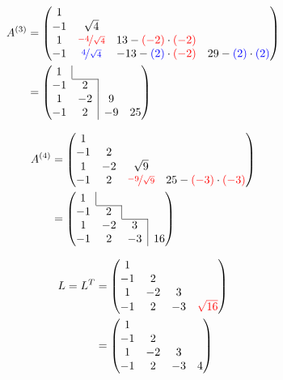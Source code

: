 \begin{align*}
A^{(3)} & =
\begin{pmatrix}1\\
  -1 & \sqrt{4}\\
  1  & {\color{red}\nicefrac{-4}{\sqrt{4}}} & 13-{\color{red}(-2)}\cdot{\color{red}(-2)}\\
  -1 & {\color{blue}\nicefrac{4}{\sqrt{4}}} & -13-{\color{blue}(2)}\cdot{\color{red}(-2)} & 29-{\color{blue}(2)}\cdot{\color{blue}(2)}
\end{pmatrix}\\
 & =
\begin{pmatrix}
  \bord{1}\\
  \cline{2-2}-1 & \bord{2}\\
  1             & \bord{-2} & 9\\
  -1            & \bord{2}  & -9 & 25
\end{pmatrix}
\end{align*}


\begin{align*}
A^{(4)} & =
\begin{pmatrix}
  1\\
  -1 & 2\\
  1  & -2 & \sqrt{9}\\
  -1 & 2  & {\color{red}\nicefrac{-9}{\sqrt{9}}} & 25-{\color{red}(-3)}\cdot{\color{red}(-3)}
\end{pmatrix}\\
 & =
\begin{pmatrix}
  \bord{1}\\
  \cline{2-2}-1 & \bord{2}\\
  \cline{3-3}1  & -2 & \bord{3}\\
  -1            & 2  & \bord{-3} & 16
\end{pmatrix}
\end{align*}


\begin{align*}
L = L^T & =
\begin{pmatrix}
  1\\
  -1 & 2\\
  1  & -2 & 3\\
  -1 & 2  & -3 & {\color{red}\sqrt{16}}
\end{pmatrix}\\
 & =
\begin{pmatrix}1\\
  -1 & 2\\
  1  & -2 & 3\\
  -1 & 2  & -3 & 4
\end{pmatrix}
\end{align*}



